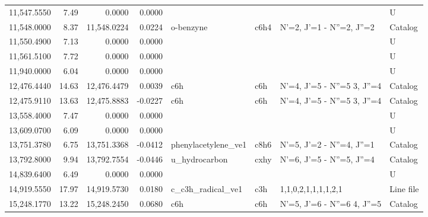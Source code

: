 \begin{longtable}{rrrrllll}
11,547.5550 &      7.49 &            0.0000 &    0.0000 &                             &         &                                      &          U \\
11,548.0000 &      8.37 &       11,548.0224 &    0.0224 &                   o-benzyne &    c6h4 &            N'=2, J'=1 - N''=2, J''=2 &    Catalog \\
11,550.4900 &      7.13 &            0.0000 &    0.0000 &                             &         &                                      &          U \\
11,561.5100 &      7.72 &            0.0000 &    0.0000 &                             &         &                                      &          U \\
11,940.0000 &      6.04 &            0.0000 &    0.0000 &                             &         &                                      &          U \\
12,476.4440 &     14.63 &       12,476.4479 &    0.0039 &                         c6h &     c6h &      N'=4, J'=5 - N''=5     3, J''=4 &    Catalog \\
12,475.9110 &     13.63 &       12,475.8883 &   -0.0227 &                         c6h &     c6h &      N'=4, J'=5 - N''=5     3, J''=4 &    Catalog \\
13,558.4000 &      7.47 &            0.0000 &    0.0000 &                             &         &                                      &          U \\
13,609.0700 &      6.09 &            0.0000 &    0.0000 &                             &         &                                      &          U \\
13,751.3780 &      6.75 &       13,751.3368 &   -0.0412 &         phenylacetylene_ve1 &    c8h6 &            N'=5, J'=2 - N''=4, J''=1 &    Catalog \\
13,792.8000 &      9.94 &       13,792.7554 &   -0.0446 &               u_hydrocarbon &    cxhy &            N'=6, J'=5 - N''=5, J''=4 &    Catalog \\
14,839.6400 &      6.49 &            0.0000 &    0.0000 &                             &         &                                      &          U \\
14,919.5550 &     17.97 &       14,919.5730 &    0.0180 &           c_c3h_radical_ve1 &     c3h &                  1,1,0,2,1,1,1,1,2,1 &  Line file \\
15,248.1770 &     13.22 &       15,248.2450 &    0.0680 &                         c6h &     c6h &      N'=5, J'=6 - N''=6     4, J''=5 &    Catalog \\

\end{longtable}
